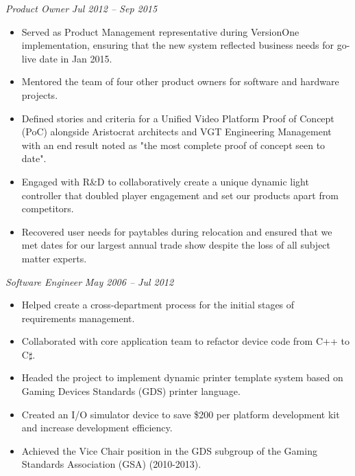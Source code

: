 {\sl Product Owner} \hfill {\sl Jul 2012 -- Sep 2015}
\begin{itemize}
\item Served as Product Management representative during VersionOne implementation, ensuring that the new system reflected business needs for go-live date in Jan 2015.
\item Mentored the team of four other product owners for software and hardware projects.
\item Defined stories and criteria for a Unified Video Platform Proof of Concept (PoC) alongside Aristocrat architects and VGT Engineering Management with an end result noted as "the most complete proof of concept seen to date".
\item Engaged with R\&D to collaboratively create a unique dynamic light controller that doubled player engagement and set our products apart from competitors.
\item Recovered user needs for paytables during relocation and ensured that we met dates for our largest annual trade show despite the loss of all subject matter experts.
\end{itemize} 


{\sl Software Engineer} \hfill {\sl May 2006 -- Jul 2012} 
\begin{itemize} 
\item Helped create a cross-department process for the initial stages of requirements management.
\item Collaborated with core application team to refactor device code from C++ to C\(\sharp\).
\item Headed the project to implement dynamic printer template system based on Gaming Devices Standards (GDS) printer language.
\item Created an I/O simulator device to save \$200 per platform development kit and increase development efficiency.
\item Achieved the Vice Chair position in the GDS subgroup of the Gaming Standards Association (GSA) (2010-2013).
\end{itemize}